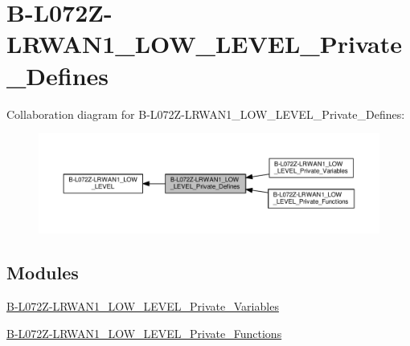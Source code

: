 \hypertarget{group__B-L072Z-LRWAN1__LOW__LEVEL__Private__Defines}{}\section{B-\/\+L072\+Z-\/\+L\+R\+W\+A\+N1\+\_\+\+L\+O\+W\+\_\+\+L\+E\+V\+E\+L\+\_\+\+Private\+\_\+\+Defines}
\label{group__B-L072Z-LRWAN1__LOW__LEVEL__Private__Defines}
Collaboration diagram for B-\/\+L072\+Z-\/\+L\+R\+W\+A\+N1\+\_\+\+L\+O\+W\+\_\+\+L\+E\+V\+E\+L\+\_\+\+Private\+\_\+\+Defines\+:
\nopagebreak
\begin{figure}[H]
\begin{center}
\leavevmode
\includegraphics[width=350pt]{group__B-L072Z-LRWAN1__LOW__LEVEL__Private__Defines}
\end{center}
\end{figure}
\subsection*{Modules}
\begin{DoxyCompactItemize}
\item 
\hyperlink{group__B-L072Z-LRWAN1__LOW__LEVEL__Private__Variables}{B-\/\+L072\+Z-\/\+L\+R\+W\+A\+N1\+\_\+\+L\+O\+W\+\_\+\+L\+E\+V\+E\+L\+\_\+\+Private\+\_\+\+Variables}
\item 
\hyperlink{group__B-L072Z-LRWAN1__LOW__LEVEL__Private__Functions}{B-\/\+L072\+Z-\/\+L\+R\+W\+A\+N1\+\_\+\+L\+O\+W\+\_\+\+L\+E\+V\+E\+L\+\_\+\+Private\+\_\+\+Functions}
\end{DoxyCompactItemize}
